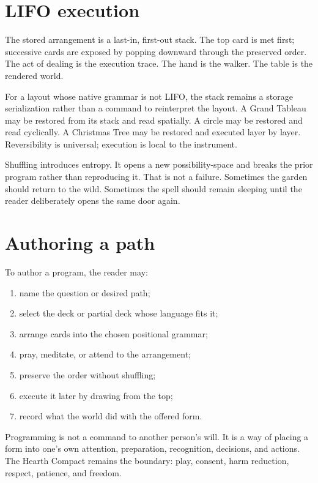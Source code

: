 \section{LIFO execution}

The stored arrangement is a last-in, first-out stack. The top card is met first;
successive cards are exposed by popping downward through the preserved order.
The act of dealing is the execution trace. The hand is the walker. The table is
the rendered world.

For a layout whose native grammar is not LIFO, the stack remains a storage
serialization rather than a command to reinterpret the layout. A Grand Tableau
may be restored from its stack and read spatially. A circle may be restored and
read cyclically. A Christmas Tree may be restored and executed layer by layer.
Reversibility is universal; execution is local to the instrument.

Shuffling introduces entropy. It opens a new possibility-space and breaks the
prior program rather than reproducing it. That is not a failure. Sometimes the
garden should return to the wild. Sometimes the spell should remain sleeping
until the reader deliberately opens the same door again.

\section{Authoring a path}

To author a program, the reader may:

\begin{enumerate}
\item name the question or desired path;
\item select the deck or partial deck whose language fits it;
\item arrange cards into the chosen positional grammar;
\item pray, meditate, or attend to the arrangement;
\item preserve the order without shuffling;
\item execute it later by drawing from the top;
\item record what the world did with the offered form.
\end{enumerate}

Programming is not a command to another person's will. It is a way of placing
a form into one's own attention, preparation, recognition, decisions, and
actions. The Hearth Compact remains the boundary: play, consent, harm
reduction, respect, patience, and freedom.

